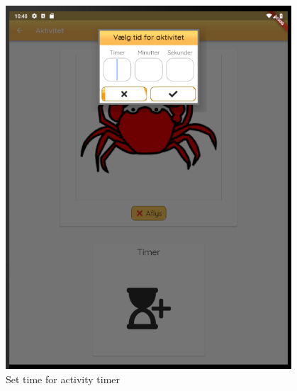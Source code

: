 \begin{figure}[H]
    \begin{center}
        \includegraphics[width=0.95\textwidth]{figures/FinalScreen/showActivityGuardianSetTimer.png}
    \end{center}
    \caption{Set time for activity timer}
    \label{fig:finalShowActivityGuardianSetTimer}
\end{figure}
